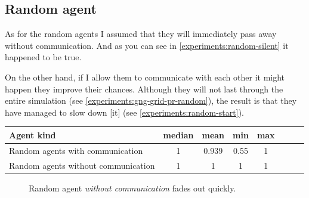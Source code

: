 \clearpage

\subsection{Random agent}   

As for the random agents I assumed that they will immediately pass away without communication. And as you can see in \ref{experiments:random-silent} it happened to be true. 

On the other hand, if I allow them to communicate with each other it might happen they improve their chances. Although they will not last through the entire simulation (see \ref{experiments:gng-grid-pr-random}), the result is that they have managed to slow down [it] (see \ref{experiments:random-start}).

\begin{center}   
  \begin{tabular}{l*{6}{c}r}
  Agent kind        & median & mean & min & max \\
  \hline  
  Random agents with communication     & 1 & 0.939 & 0.55 & 1  \\
  Random agents without communication    & 1 & 1 & 1 & 1  \\
  \end{tabular}                  
\end{center}

\begin{figure}[h!]
  \centering        
  \caption{Random agent \emph{without communication} fades out quickly.}
\end{figure} 


